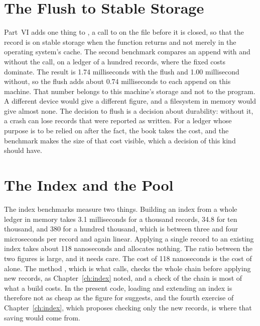 \section{The Flush to Stable Storage}

Part~VI adds one thing to , a call to  on the file before it is closed, so that the record is on stable storage when the function returns and not merely in the operating system's cache. The second benchmark compares an append with and without the call, on a ledger of a hundred records, where the fixed costs dominate. The result is 1.74 milliseconds with the flush and 1.00 millisecond without, so the flush adds about 0.74 milliseconds to each append on this machine. That number belongs to this machine's storage and not to the program. A different device would give a different figure, and a filesystem in memory would give almost none. The decision to flush is a decision about durability: without it, a crash can lose records that were reported as written. For a ledger whose purpose is to be relied on after the fact, the book takes the cost, and the benchmark makes the size of that cost visible, which a decision of this kind should have.

\section{The Index and the Pool}

The index benchmarks measure two things. Building an index from a whole ledger in memory takes 3.1 milliseconds for a thousand records, 34.8 for ten thousand, and 380 for a hundred thousand, which is between three and four microseconds per record and again linear. Applying a single record to an existing index takes about 118 nanoseconds and allocates nothing. The ratio between the two figures is large, and it needs care. The cost of 118 nanoseconds is the cost of  alone. The method , which is what  calls, checks the whole chain before applying new records, as Chapter~\ref{ch:index} noted, and a check of the chain is most of what a build costs. In the present code, loading and extending an index is therefore not as cheap as the figure for  suggests, and the fourth exercise of Chapter~\ref{ch:index}, which proposes checking only the new records, is where that saving would come from.

